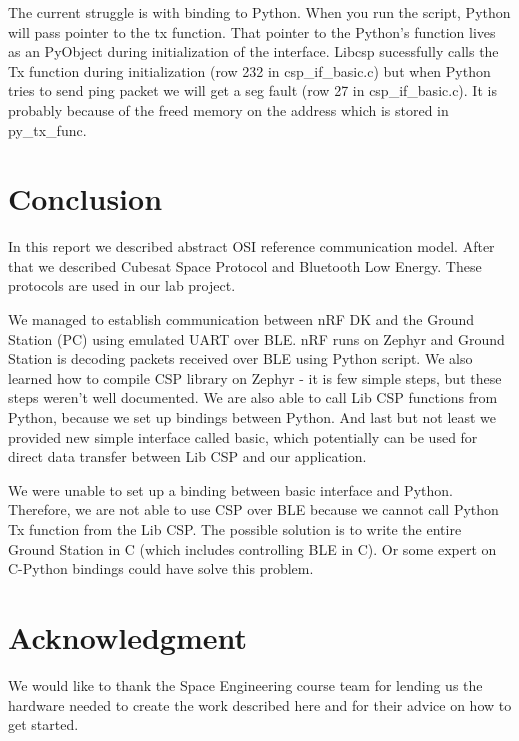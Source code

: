 \documentclass[conference]{IEEEtran}
\begin{document}
The current struggle is with binding to Python. When you run the script, Python will pass pointer to the tx function. That pointer to the Python's function lives as an PyObject during initialization of the interface. Libcsp sucessfully calls the Tx function during initialization (row 232 in csp\_if\_basic.c) but when Python tries to send ping packet we will get a seg fault (row 27 in csp\_if\_basic.c). It is probably because of the freed memory on the address which is stored in py\_tx\_func.

\section{Conclusion}
In this report we described abstract OSI reference communication model. After that we described Cubesat Space Protocol and Bluetooth Low Energy. These protocols are used in our lab project. 

We managed to establish communication between nRF DK and the Ground Station (PC) using emulated UART over BLE. nRF runs on Zephyr and Ground Station is decoding packets received over BLE using Python script. We also learned how to compile CSP library on Zephyr - it is few simple steps, but these steps weren't well documented. We are also able to call Lib CSP functions from Python, because we set up bindings between Python. And last but not least we provided new simple interface called basic, which potentially can be used for direct data transfer between Lib CSP and our application.

We were unable to set up a binding between basic interface and Python. Therefore, we are not able to use CSP over BLE because we cannot call Python Tx function from the Lib CSP. The possible solution is to write the entire Ground Station in C (which includes controlling BLE in C). Or some expert on C-Python bindings could have solve this problem.

\section*{Acknowledgment}
We would like to thank the Space Engineering course team for lending us the hardware needed to create the work described here and for their advice on how to get started.



\end{document}

